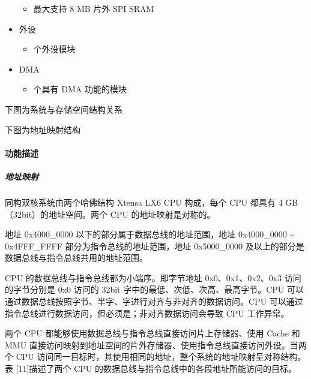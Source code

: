 \documentclass[a4paper,12pt,english]{sphinxmanual}
\begin{document}
\begin{itemize}
\begin{itemize}
\item {} 
\sphinxAtStartPar
最大支持 8 MB 片外 SPI SRAM

\end{itemize}

\item {} 
\sphinxAtStartPar
外设
\begin{itemize}
\item {} 
 个外设模块

\end{itemize}

\item {} 
\sphinxAtStartPar
DMA
\begin{itemize}
\item {} 
 个具有 DMA 功能的模块

\end{itemize}

\end{itemize}

\sphinxAtStartPar
下图为系统与存储空间结构关系

\sphinxAtStartPar
{}

\sphinxAtStartPar
下图为地址映射结构

\sphinxAtStartPar
{}


\paragraph{功能描述}
\label{\detokenize{dev-board/esp32:id9}}

\subparagraph{地址映射}
\label{\detokenize{dev-board/esp32:id10}}
\sphinxAtStartPar
同构双核系统由两个哈佛结构 Xtensa LX6 CPU 构成，每个 CPU 都具有 4 GB（32\sphinxhyphen{}bit）的地址空间。两个 CPU 的地址映射是对称的。

\sphinxAtStartPar
地址 0x4000\_0000 以下的部分属于数据总线的地址范围，地址 0x4000\_0000 \textasciitilde{} 0x4FFF\_FFFF 部分为指令总线的地址范围，地址 0x5000\_0000 及以上的部分是数据总线与指令总线共用的地址范围。

\sphinxAtStartPar
CPU 的数据总线与指令总线都为小端序。即字节地址 0x0、0x1、0x2、0x3 访问的字节分别是 0x0 访问的 32\sphinxhyphen{}bit 字中的最低、次低、次高、最高字节。CPU 可以通过数据总线按照字节、半字、字进行对齐与非对齐的数据访问。CPU 可以通过指令总线进行数据访问，但必须是；非对齐数据访问会导致 CPU 工作异常。

\sphinxAtStartPar
两个 CPU 都能够使用数据总线与指令总线直接访问片上存储器、使用 Cache 和 MMU 直接访问映射到地址空间的片外存储器、使用指令总线直接访问外设。当两个 CPU 访问同一目标时，其使用相同的地址，整个系统的地址映射呈对称结构。表 {[}1\sphinxhyphen{}1{]}描述了两个 CPU 的数据总线与指令总线中的各段地址所能访问的目标。
\end{document}
